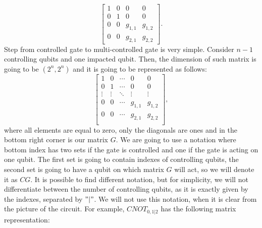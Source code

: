 \begin{equation}
    \begin{bmatrix}
        1 & 0 & 0 & 0 \\ 
        0 & 1 & 0 & 0 \\
        0 & 0 & g_{1,1} & g_{1,2} \\
        0 & 0 & g_{2,1} & g_{2,2} 
    \end{bmatrix}.
\end{equation}
Step from controlled gate to multi-controlled gate is very simple. Consider $n-1$ controlling qubits and one impacted qubit. Then, the dimension of such matrix is going to be $(2^n ,2^n)$ and it is going to be represented as follows:
\begin{equation}
    \begin{bmatrix}
        1 & 0 & \cdots & 0 & 0 \\ 
        0 & 1 & \cdots & 0 & 0 \\
        \vdots & \vdots & \ddots & \vdots & \vdots \\
        0 & 0 &  \cdots & g_{1,1} & g_{1,2} \\
        0 & 0 &  \cdots & g_{2,1} & g_{2,2} \\

    \end{bmatrix},
\end{equation}
where all elements are equal to zero, only the diagonals are ones and in the bottom right corner is our matrix $G$.  We are going to use a notation where bottom index has two sets if the gate is controlled and one if the gate is acting on one qubit. The first set is going to
contain indexes of controlling qubits, the second set is going to have a qubit on which matrix $G$ will act, so we will denote it as $CG$. It is possible to find different notation, but for simplicity, we will not differentiate between the number of controlling qubits, as it is exactly given by the indexes, separated by $"|"$. We will not use this notation, when it is clear from the picture of the circuit. For example, $CNOT_{0,1|2} $  has the following matrix representation:

